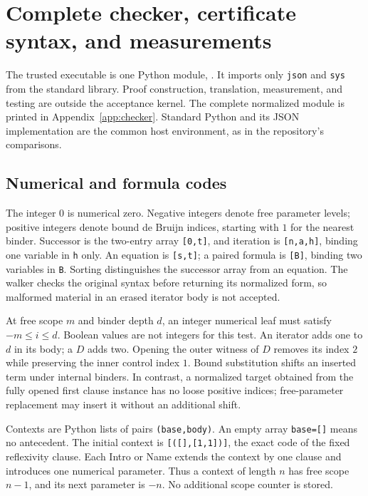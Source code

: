 \section{Complete checker, certificate syntax, and measurements}
\label{sec:implementation}

The trusted executable is one Python module, .
It imports only \texttt{json} and \texttt{sys} from the standard library.
Proof construction, translation, measurement, and testing are outside the
acceptance kernel. The complete normalized module is printed in
Appendix~\ref{app:checker}. Standard Python and its JSON implementation
are the common host environment, as in the repository's comparisons.

\subsection{Numerical and formula codes}

The integer $0$ is numerical zero. Negative integers denote free
parameter levels; positive integers denote bound de Bruijn indices,
starting with $1$ for the nearest binder. Successor is the two-entry
array \texttt{[0,t]}, and iteration is \texttt{[n,a,h]}, binding one
variable in \texttt{h} only. An equation is \texttt{[s,t]}; a paired
formula is \texttt{[B]}, binding two variables in \texttt{B}. Sorting
distinguishes the successor array from an equation. The walker checks
the original syntax before returning its normalized form, so malformed
material in an erased iterator body is not accepted.

At free scope $m$ and binder depth $d$, an integer numerical leaf must
satisfy $-m\le i\le d$. Boolean values are not integers for this test.
An iterator adds one to $d$ in its body; a $D$ adds two. Opening the
outer witness of $D$ removes its index $2$ while preserving the inner
control index $1$. Bound substitution shifts an inserted term under
internal binders. In contrast, a normalized target obtained from the
fully opened first clause instance has no loose positive indices;
free-parameter replacement may insert it without an additional shift.

Contexts are Python lists of pairs \texttt{(base,body)}. An empty
array \texttt{base=[]} means no antecedent. The initial context is
\texttt{[([],[1,1])]}, the exact code of the fixed reflexivity clause.
Each Intro or Name extends the context by one clause and introduces one
numerical parameter. Thus a context of length $n$ has free scope $n-1$,
and its next parameter is $-n$. No additional scope counter is stored.

